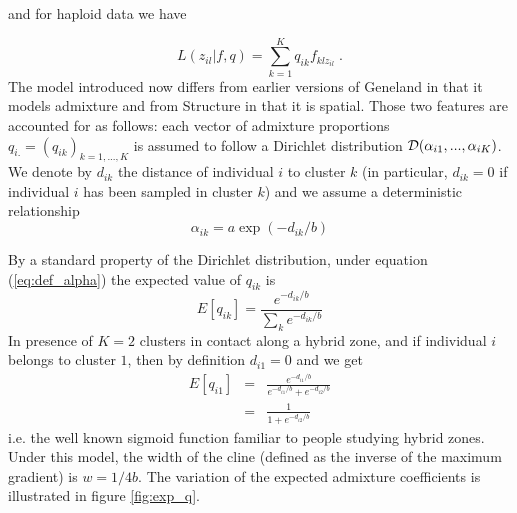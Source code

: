 \documentclass[a4paper,10pt]{article}
\begin{document}
and for haploid data we have

\begin{equation}\label{eq:admix_like}
L(z_{il} | f,q) = \sum_{k=1}^K q_{ik} f_{klz_{il}}\;.
\end{equation}
The model introduced now differs from earlier versions of {\sc Geneland} in that it  models admixture 
and from {\sc Structure} in that it is spatial. Those two features are accounted for as follows:
each vector of admixture proportions $q_{i.}=(q_{ik})_{k=1,...,K}$ is assumed to follow a  
Dirichlet distribution ${\cal D}(\alpha_{i1},...,\alpha_{iK})$.
We denote by $d_{ik}$ the distance of individual $i$ to cluster $k$ (in particular,  $d_{ik}=0$ 
if individual $i$ has been sampled in cluster $k$) 
and we assume a deterministic  relationship 
\begin{equation}\label{eq:def_alpha}
\alpha_{ik} = a\exp(-d_{ik}/b)
\end{equation}


By a standard property of the Dirichlet distribution, under equation (\ref{eq:def_alpha}) the expected value of $q_{ik}$ is 
\begin{equation}\label{eq:expect_q}
  E[q_{ik}] = \frac{e^{-d_{ik}/b}}{\sum_k e^{-d_{ik}/b}}
\end{equation}
In presence of $K=2$ clusters in contact along a hybrid zone, 
and if individual $i$ belongs to cluster $1$, 
then by definition $d_{i1}=0$ and we get 
\begin{eqnarray}
  E[q_{i1}] & = & \frac{e^{-d_{i1}/b}}{e^{-d_{i1}/b}+e^{-d_{i2}/b}} \nonumber \\
 & = & \frac{1}{1+e^{-d_{i2}/b}} \label{eq:expect_q_K=2}
\end{eqnarray}
i.e. the well known sigmoid function familiar to people studying hybrid zones.
Under this model, the width of the cline (defined as the inverse of the maximum gradient) is $w=1/4b$.
The variation of the expected admixture coefficients is illustrated in figure \ref{fig:exp_q}.
\end{document}

